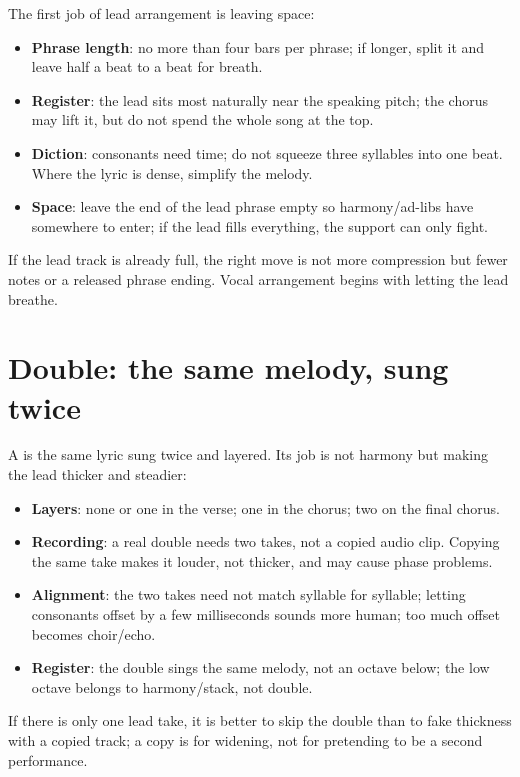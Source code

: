 The first job of lead arrangement is leaving space:

\begin{itemize}
\item \textbf{Phrase length}: no more than four bars per phrase; if longer, split it and leave half a beat to a beat for breath.
\item \textbf{Register}: the lead sits most naturally near the speaking pitch; the chorus may lift it, but do not spend the whole song at the top.
\item \textbf{Diction}: consonants need time; do not squeeze three syllables into one beat. Where the lyric is dense, simplify the melody.
\item \textbf{Space}: leave the end of the lead phrase empty so harmony/ad-libs have somewhere to enter; if the lead fills everything, the support can only fight.
\end{itemize}

If the lead track is already full, the right move is not more compression but fewer notes or a released phrase ending. Vocal arrangement begins with letting the lead breathe.

\section{Double: the same melody, sung twice}
\label{sec:double}

A  is the same lyric sung twice and layered. Its job is not harmony but making the lead thicker and steadier:

\begin{itemize}
\item \textbf{Layers}: none or one in the verse; one in the chorus; two on the final chorus.
\item \textbf{Recording}: a real double needs two takes, not a copied audio clip. Copying the same take makes it louder, not thicker, and may cause phase problems.
\item \textbf{Alignment}: the two takes need not match syllable for syllable; letting consonants offset by a few milliseconds sounds more human; too much offset becomes choir/echo.
\item \textbf{Register}: the double sings the same melody, not an octave below; the low octave belongs to harmony/stack, not double.
\end{itemize}

If there is only one lead take, it is better to skip the double than to fake thickness with a copied track; a copy is for widening, not for pretending to be a second performance.


